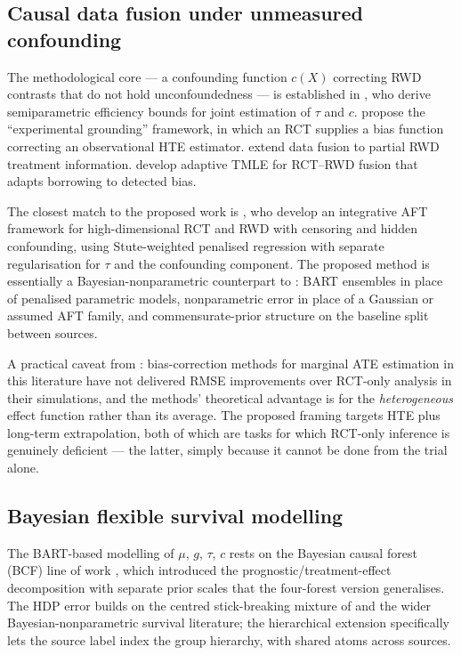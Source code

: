 \documentclass[11pt]{article}
\theoremstyle{plain}
\theoremstyle{definition}
\theoremstyle{remark}
\newcommand{\1}{\mathds{1}}
\newcommand{\X}{X}
\newcommand{\tauf}{\tau}
\newcommand{\cf}{c}
\newcommand{\gf}{g}
\newcommand{\muf}{\mu}
\begin{document}
\subsection{Causal data fusion under unmeasured confounding}

The methodological core --- a confounding function $\cf(\X)$ correcting RWD
contrasts that do not hold unconfoundedness --- is established in
\citet{YangLiuZengWang2025}, who derive semiparametric efficiency bounds for
joint estimation of $\tauf$ and $\cf$. \citet{Kallus2018} propose the
``experimental grounding'' framework, in which an RCT supplies a bias
function correcting an observational HTE estimator. \citet{Yao2024} extend
data fusion to partial RWD treatment information. \citet{vanderLaan2024}
develop adaptive TMLE for RCT--RWD fusion that adapts borrowing to detected
bias.

The closest match to the proposed work is \citet{Ye2025}, who develop an
integrative AFT framework for high-dimensional RCT and RWD with censoring
and hidden confounding, using Stute-weighted penalised regression with
separate regularisation for $\tauf$ and the confounding component. The
proposed method is essentially a Bayesian-nonparametric counterpart to
\citet{Ye2025}: BART ensembles in place of penalised parametric models,
nonparametric error in place of a Gaussian or assumed AFT family, and
commensurate-prior structure on the baseline split between sources.

A practical caveat from \citet{Lin2024}: bias-correction methods for
marginal ATE estimation in this literature have not delivered
RMSE improvements over RCT-only analysis in their simulations, and the
methods' theoretical advantage is for the \emph{heterogeneous} effect
function rather than its average. The proposed framing targets HTE
plus long-term extrapolation, both of which are tasks for which RCT-only
inference is genuinely deficient --- the latter, simply because it cannot
be done from the trial alone.

\subsection{Bayesian flexible survival modelling}

The BART-based modelling of $\muf$, $\gf$, $\tauf$, $\cf$ rests on the
Bayesian causal forest (BCF) line of work \citep{hahn2020bayesian}, which introduced
the prognostic/treatment-effect decomposition with separate prior scales
that the four-forest version generalises. The HDP error builds on the
centred stick-breaking mixture of \citet{yang2010semiparametric} and the wider
Bayesian-nonparametric survival literature; the hierarchical extension
specifically lets the source label index the group hierarchy, with shared
atoms across sources.
\end{document}
